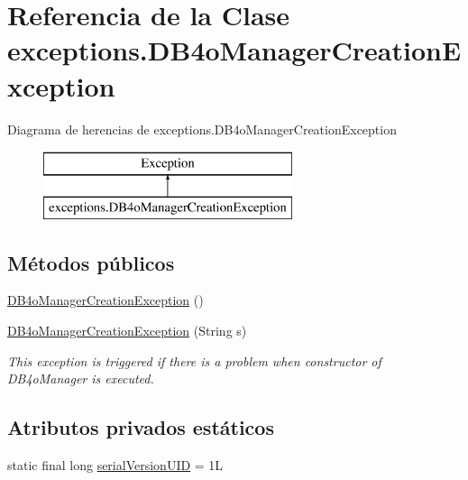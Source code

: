 \hypertarget{classexceptions_1_1_d_b4o_manager_creation_exception}{}\section{Referencia de la Clase exceptions.\+D\+B4o\+Manager\+Creation\+Exception}
\label{classexceptions_1_1_d_b4o_manager_creation_exception}
Diagrama de herencias de exceptions.\+D\+B4o\+Manager\+Creation\+Exception\begin{figure}[H]
\begin{center}
\leavevmode
\includegraphics[height=2.000000cm]{classexceptions_1_1_d_b4o_manager_creation_exception}
\end{center}
\end{figure}
\subsection*{Métodos públicos}
\begin{DoxyCompactItemize}
\item 
\mbox{\hyperlink{classexceptions_1_1_d_b4o_manager_creation_exception_a5da5879180740606e8a3f1c2f88f01dc}{D\+B4o\+Manager\+Creation\+Exception}} ()
\item 
\mbox{\hyperlink{classexceptions_1_1_d_b4o_manager_creation_exception_a45281047a13292cbee85b6f04547adc5}{D\+B4o\+Manager\+Creation\+Exception}} (String s)
\begin{DoxyCompactList}\small\item\em This exception is triggered if there is a problem when constructor of D\+B4o\+Manager is executed. \end{DoxyCompactList}\end{DoxyCompactItemize}
\subsection*{Atributos privados estáticos}
\begin{DoxyCompactItemize}
\item 
static final long \mbox{\hyperlink{classexceptions_1_1_d_b4o_manager_creation_exception_af611b151185c866376c172feb883428a}{serial\+Version\+U\+ID}} = 1L
\end{DoxyCompactItemize}


